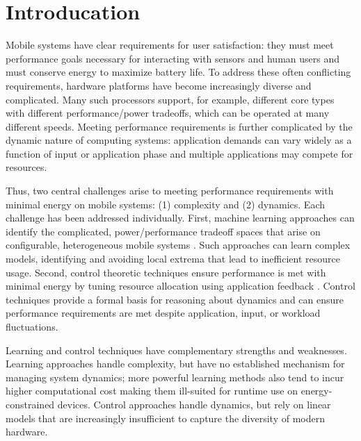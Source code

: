 \section{Introducation}
Mobile systems have clear requirements for user satisfaction: they
must meet performance goals necessary for interacting with sensors and
human users and must conserve energy to maximize battery life.  To
address these often conflicting requirements, hardware platforms have
become increasingly diverse and complicated.  Many such processors
support, for example, different core types with different
performance/power tradeoffs, which can be operated at many different
speeds.  Meeting performance requirements is further complicated by
the dynamic nature of computing systems: application demands can vary
widely as a function of input or application phase and multiple
applications may compete for resources.

Thus, two central challenges arise to meeting performance requirements
with minimal energy on mobile systems: (1) complexity and (2)
dynamics.  Each challenge has been addressed individually.  First,
machine learning approaches can identify the complicated,
power/performance tradeoff spaces that arise on configurable,
heterogeneous mobile systems
\cite{dubach2010,Bitirgen2008,Ipek,Koala,LEO,Flicker,Ponamarev}.  Such
approaches can learn complex models, identifying and avoiding local
extrema that lead to inefficient resource usage.  Second, control
theoretic techniques ensure performance is met with minimal energy by
tuning resource allocation using application feedback
\cite{Wu2004,Chen2011,PTRADE,POET,ControlWare,Agilos,grace2}.  Control
techniques provide a formal basis for reasoning about dynamics and can
ensure performance requirements are met despite application, input, or
workload fluctuations.

Learning and control techniques have complementary strengths and
weaknesses.  Learning approaches handle complexity, but have no
established mechanism for managing system dynamics; more powerful
learning methods also tend to incur higher computational cost making
them ill-suited for runtime use on energy-constrained devices.
Control approaches handle dynamics, but rely on linear models that are
increasingly insufficient to capture the diversity of modern hardware.

